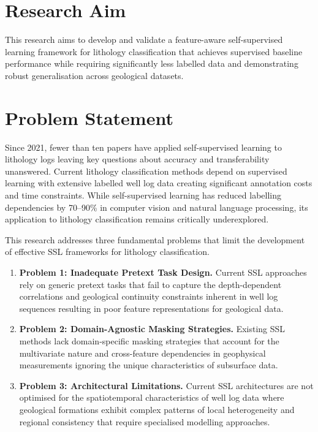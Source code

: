 \section{Research Aim}

This research aims to develop and validate a feature-aware self-supervised learning framework for lithology classification that achieves supervised baseline performance while requiring significantly less labelled data and demonstrating robust generalisation across geological datasets.


\section{Problem Statement}

Since 2021, fewer than ten papers have applied self-supervised learning to lithology logs leaving key questions about accuracy and transferability unanswered. Current lithology classification methods depend on supervised learning with extensive labelled well log data creating significant annotation costs and time constraints. While self-supervised learning has reduced labelling dependencies by 70--90\% in computer vision and natural language processing, its application to lithology classification remains critically underexplored.

This research addresses three fundamental problems that limit the development of effective SSL frameworks for lithology classification.

\begin{enumerate}[label=\roman*.]
\item \textbf{Problem 1: Inadequate Pretext Task Design.} Current SSL approaches rely on generic pretext tasks that fail to capture the depth-dependent correlations and geological continuity constraints inherent in well log sequences resulting in poor feature representations for geological data.

\item \textbf{Problem 2: Domain-Agnostic Masking Strategies.} Existing SSL methods lack domain-specific masking strategies that account for the multivariate nature and cross-feature dependencies in geophysical measurements ignoring the unique characteristics of subsurface data.

\item \textbf{Problem 3: Architectural Limitations.} Current SSL architectures are not optimised for the spatiotemporal characteristics of well log data where geological formations exhibit complex patterns of local heterogeneity and regional consistency that require specialised modelling approaches.
\end{enumerate}

